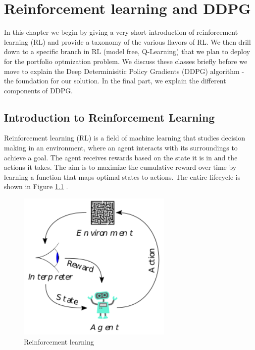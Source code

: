 
\chapter{Reinforcement learning and DDPG}\label{chapter:introduction}

In this chapter we begin by giving a very short introduction of reinforcement learning (RL) and provide a taxonomy of the various flavors of RL. We then drill down to a specific branch in RL (model free, Q-Learning) that we plan to deploy for the portfolio optmization problem. We discuss these classes briefly before we move to explain the Deep Determinisitic Policy Gradients (DDPG) algorithm - the foundation for our solution. In the final part, we explain the different components of DDPG.

\section{Introduction to Reinforcement Learning}
Reinforcement learning (RL) is a field of machine learning that studies decision making in an environment, where an agent interacts with its surroundings to achieve a goal. The agent receives rewards based on the state it is in and the actions it takes. The aim is to maximize the cumulative reward over time by learning a function that maps optimal states to actions. The entire lifecycle is shown in Figure \ref{fig:rl_basic} \cite{wiki:reinforcement_learning}.

\begin{figure}[htpb]
  \centering
  \includegraphics[width=75mm]{figures/Reinforcement_learning_diagram.png}
  \caption{Reinforcement learning} \label{fig:rl_basic}
\end{figure}

